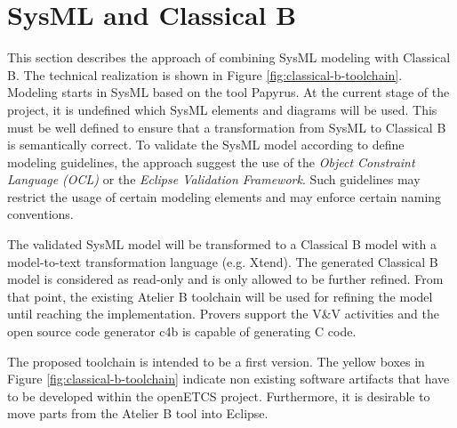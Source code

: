 \chapter{SysML and Classical B}
\label{sec:sysML-B}

This section describes the approach of combining SysML modeling with
Classical B. The technical realization is shown in Figure
\ref{fig:classical-b-toolchain}. Modeling starts in SysML based on the
tool Papyrus. At the current stage of the project, it is undefined
which SysML elements and diagrams will be used. This must be well
defined to ensure that a transformation from SysML to Classical B is
semantically correct. To validate the SysML model according to define
modeling guidelines, the approach suggest the use of the \emph{Object
  Constraint Language (OCL)} or the \emph{Eclipse Validation
  Framework}. Such guidelines may restrict the usage of certain
modeling elements and may enforce certain naming conventions.

The validated SysML model will be transformed to a Classical B model
with a model-to-text transformation language (e.g. Xtend). The
generated Classical B model is considered as read-only and is only
allowed to be further refined. From that point, the existing Atelier B
toolchain will be used for refining the model until reaching the
implementation. Provers support the V\&V activities and the open
source code generator c4b is capable of generating C code.

The proposed toolchain is intended to be a first version. The yellow
boxes in Figure \ref{fig:classical-b-toolchain} indicate non existing
software artifacts that have to be developed within the openETCS
project. Furthermore, it is desirable to move parts from the Atelier B
tool into Eclipse. 

